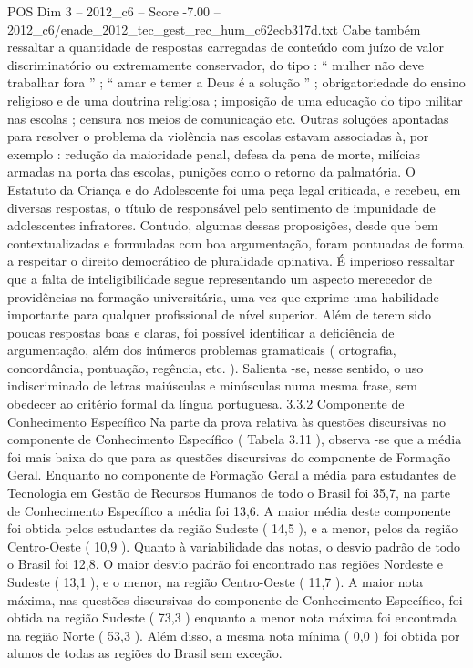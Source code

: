 \begin{textsample}{POS Dim 3 – 2012\_c6 – Score -7.00 – 2012\_c6/enade\_2012\_tec\_gest\_rec\_hum\_c62ecb317d.txt}
Cabe também ressaltar a quantidade de respostas carregadas de conteúdo com juízo de valor discriminatório ou extremamente conservador, do tipo : “ mulher não deve trabalhar fora ” ; “ amar e temer a Deus é a solução ” ; obrigatoriedade do ensino religioso e de uma doutrina religiosa ; imposição de uma educação do tipo militar nas escolas ; censura nos meios de comunicação etc.
Outras soluções apontadas para resolver o problema da violência nas escolas estavam associadas à, por exemplo : redução da maioridade penal, defesa da pena de morte, milícias armadas na porta das escolas, punições como o retorno da palmatória.
O Estatuto da Criança e do Adolescente foi uma peça legal criticada, e recebeu, em diversas respostas, o título de responsável pelo sentimento de impunidade de adolescentes infratores.
Contudo, algumas dessas proposições, desde que bem contextualizadas e formuladas com boa argumentação, foram pontuadas de forma a respeitar o direito democrático de pluralidade opinativa.
É imperioso ressaltar que a falta de inteligibilidade segue representando um aspecto merecedor de providências na formação universitária, uma vez que exprime uma habilidade importante para qualquer profissional de nível superior.
Além de terem sido poucas respostas boas e claras, foi possível identificar a deficiência de argumentação, além dos inúmeros problemas gramaticais ( ortografia, concordância, pontuação, regência, etc. ).
Salienta -se, nesse sentido, o uso indiscriminado de letras maiúsculas e minúsculas numa mesma frase, sem obedecer ao critério formal da língua portuguesa. 3.3.2 Componente de Conhecimento Específico Na parte da prova relativa às questões discursivas no componente de Conhecimento Específico ( Tabela 3.11 ), observa -se que a média foi mais baixa do que para as questões discursivas do componente de Formação Geral.
Enquanto no componente de Formação Geral a média para estudantes de Tecnologia em Gestão de Recursos Humanos de todo o Brasil foi 35,7, na parte de Conhecimento Específico a média foi 13,6.
A maior média deste componente foi obtida pelos estudantes da região Sudeste ( 14,5 ), e a menor, pelos da região Centro-Oeste ( 10,9 ).
Quanto à variabilidade das notas, o desvio padrão de todo o Brasil foi 12,8.
O maior desvio padrão foi encontrado nas regiões Nordeste e Sudeste ( 13,1 ), e o menor, na região Centro-Oeste ( 11,7 ).
A maior nota máxima, nas questões discursivas do componente de Conhecimento Específico, foi obtida na região Sudeste ( 73,3 ) enquanto a menor nota máxima foi encontrada na região Norte ( 53,3 ).
Além disso, a mesma nota mínima ( 0,0 ) foi obtida por alunos de todas as regiões do Brasil sem exceção.

\end{textsample}
